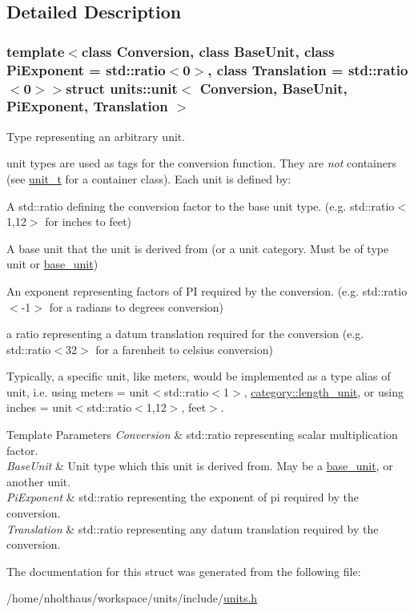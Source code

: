 \subsection{Detailed Description}
\subsubsection*{template$<$class Conversion, class Base\+Unit, class Pi\+Exponent = std\+::ratio$<$0$>$, class Translation = std\+::ratio$<$0$>$$>$struct units\+::unit$<$ Conversion, Base\+Unit, Pi\+Exponent, Translation $>$}

Type representing an arbitrary unit. 

{\ttfamily unit} types are used as tags for the {\ttfamily conversion} function. They are {\itshape not} containers (see {\ttfamily \hyperlink{classunits_1_1unit__t}{unit\+\_\+t}} for a container class). Each unit is defined by\+:


\begin{DoxyItemize}
\item A {\ttfamily std\+::ratio} defining the conversion factor to the base unit type. (e.\+g. {\ttfamily std\+::ratio$<$1,12$>$} for inches to feet)
\item A base unit that the unit is derived from (or a unit category. Must be of type {\ttfamily unit} or {\ttfamily \hyperlink{structunits_1_1base__unit}{base\+\_\+unit}})
\item An exponent representing factors of P\+I required by the conversion. (e.\+g. {\ttfamily std\+::ratio$<$-\/1$>$} for a radians to degrees conversion)
\item a ratio representing a datum translation required for the conversion (e.\+g. {\ttfamily std\+::ratio$<$32$>$} for a farenheit to celsius conversion)
\end{DoxyItemize}

Typically, a specific unit, like {\ttfamily meters}, would be implemented as a type alias of {\ttfamily unit}, i.\+e. {\ttfamily using meters = unit$<$std\+::ratio$<$1$>$, \hyperlink{namespaceunits_1_1category_a1140509fa711ad6ae98a4c001d99cfe5}{category\+::length\+\_\+unit}}, or {\ttfamily using inches = unit$<$std\+::ratio$<$1,12$>$, feet$>$}. 
\begin{DoxyTemplParams}{Template Parameters}
{\em Conversion} & std\+::ratio representing scalar multiplication factor. \\
\hline
{\em Base\+Unit} & Unit type which this unit is derived from. May be a {\ttfamily \hyperlink{structunits_1_1base__unit}{base\+\_\+unit}}, or another {\ttfamily unit}. \\
\hline
{\em Pi\+Exponent} & std\+::ratio representing the exponent of pi required by the conversion. \\
\hline
{\em Translation} & std\+::ratio representing any datum translation required by the conversion. \\
\hline
\end{DoxyTemplParams}


The documentation for this struct was generated from the following file\+:\begin{DoxyCompactItemize}
\item 
/home/nholthaus/workspace/units/include/\hyperlink{units_8h}{units.\+h}\end{DoxyCompactItemize}
